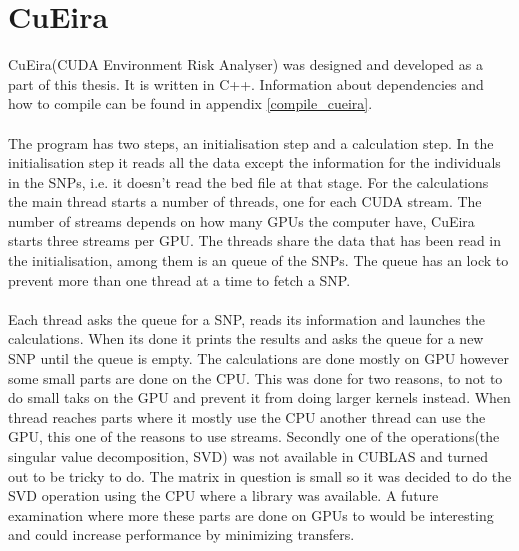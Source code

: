 \documentclass[10pt,a4paper]{report}
\begin{document}


\section{CuEira}
CuEira(CUDA Environment Risk Analyser) was designed and developed as a part of this thesis. It is written in C++. Information about dependencies and how to compile can be found in appendix \ref{compile_cueira}.\\
\\
The program has two steps, an initialisation step and a calculation step. In the initialisation step it reads all the data except the information for the individuals in the SNPs, i.e. it doesn't read the bed file at that stage. For the calculations the main thread starts a number of threads, one for each CUDA stream. The number of streams depends on how many GPUs the computer have, CuEira starts three streams per GPU. The threads share the data that has been read in the initialisation, among them is an queue of the SNPs. The queue has an lock to prevent more than one thread at a time to fetch a SNP.\\
\\
Each thread asks the queue for a SNP, reads its information and launches the calculations. When its done it prints the results and asks the queue for a new SNP until the queue is empty. The calculations are done mostly on GPU however some small parts are done on the CPU. This was done for two reasons, to not to do small taks on the GPU and prevent it from doing larger kernels instead. When thread reaches parts where it mostly use the CPU another thread can use the GPU, this one of the reasons to use streams. Secondly one of the operations(the singular value decomposition, SVD) was not available in CUBLAS and turned out to be tricky to do. The matrix in question is small so it was decided to do the SVD operation using the CPU where a library was available. A future examination where more these parts are done on GPUs to would be interesting and could increase performance by minimizing transfers.



\end{document}
